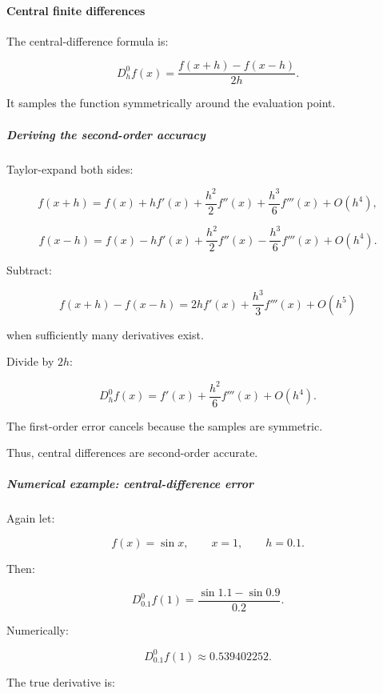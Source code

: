 \paragraph{Central finite differences}\label{02-foundations-ii-ch025-central-finite-differences}

\hypertarget{02-foundations-ii-ch025-central-finite-differences}{}

The central-difference formula is:

\[
\boxed{ D_h^0f(x)= \frac{f(x+h)-f(x-h)}{2h} }.
\]

It samples the function symmetrically around the evaluation point.

\subparagraph{Deriving the second-order accuracy}\label{02-foundations-ii-ch025-deriving-the-second-order-accuracy}

\hypertarget{02-foundations-ii-ch025-deriving-the-second-order-accuracy}{}

Taylor-expand both sides:

\[
f(x+h)= f(x)+hf'(x)+ \frac{h^2}{2}f''(x)+ \frac{h^3}{6}f'''(x)+O(h^4),
\]

\[
f(x-h)= f(x)-hf'(x)+ \frac{h^2}{2}f''(x)- \frac{h^3}{6}f'''(x)+O(h^4).
\]

Subtract:

\[
f(x+h)-f(x-h) = 2hf'(x)+\frac{h^3}{3}f'''(x)+O(h^5)
\]

when sufficiently many derivatives exist.

Divide by \(2h\):

\[
\boxed{ D_h^0f(x) = f'(x)+ \frac{h^2}{6}f'''(x)+O(h^4) }.
\]

The first-order error cancels because the samples are symmetric.

Thus, central differences are second-order accurate.

\subparagraph{Numerical example: central-difference error}\label{02-foundations-ii-ch025-numerical-example-central-difference-error}

\hypertarget{02-foundations-ii-ch025-numerical-example-central-difference-error}{}

Again let:

\[
f(x)=\sin x,\qquad x=1,\qquad h=0.1.
\]

Then:

\[
D_{0.1}^0f(1) = \frac{\sin1.1-\sin0.9}{0.2}.
\]

Numerically:

\[
\boxed{ D_{0.1}^0f(1)\approx0.539402252 }.
\]

The true derivative is:

